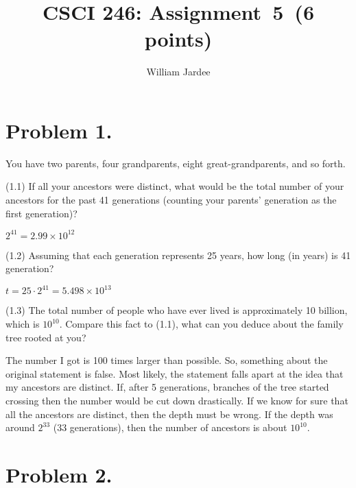 \documentclass[11pt]{article}
\begin{document}
\date{}

\title{CSCI 246: Assignment~5~(6 points)}

\author{William Jardee}

\maketitle

 
\section*{Problem 1.}

\noindent
You have two parents, four grandparents, eight great-grandparents, and so forth.
\newline

\noindent
(1.1) If all your ancestors were distinct, what would be the total number of your ancestors for the past 41 generations (counting your parents' generation as the first generation)?
\newline

$2^{41} = 2.99 \times 10^{12}$\\

\newline

\noindent
(1.2) Assuming that each generation represents 25 years, how long (in years) is 41 generation?
\newline

$t = 25 \cdot 2^{41} = 5.498 \times 10^{13}$\\

\newline

\noindent
(1.3) The total number of people who have ever lived is approximately 10
billion, which is $10^{10}$. Compare this fact to (1.1), what can you deduce
about the family tree rooted at you?
\newline

The number I got is 100 times larger than possible. So, something about the original statement is false. Most likely, the statement falls apart at the idea that my ancestors are distinct. If, after 5 generations, branches of the tree started crossing then the number would be cut down drastically. If we know for sure that all the ancestors are distinct, then the depth must be wrong. If the depth was around $2^{33}$ (33 generations), then the number of ancestors is about $10^{10}$.

\newpage


\section*{Problem 2.}
\end{document}
